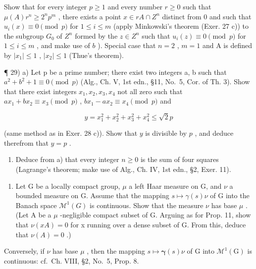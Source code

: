 Show that for every integer \(p \geqslant 1\) and every number \(r \geqslant 0\) such that \(\mu(A)r^n \geqslant 2^n p^m\) , there exists a point \(x \in rA \cap Z^n\) distinct from 0 and such that \(u_i(x) \equiv 0 \pmod{p}\) for \(1 \leqslant i \leqslant m\) (apply Minkowski's theorem (Exer. 27 c)) to the subgroup \(G_0\) of \(Z^n\) formed by the \(z \in Z^n\) such that \(u_i(z) \equiv 0 \pmod{p}\) for \(1 \leqslant i \leqslant m\) , and make use of \(b\) ). Special case that \(n = 2\) , \(m = 1\) and A is defined by \(|x_1| \leqslant 1\) , \(|x_2| \leqslant 1\) (Thue's theorem).

¶ 29) a) Let p be a prime number; there exist two integers a, b such that \(a^{2}+b^{2}+1 \equiv 0 \pmod{p}\) (Alg., Ch. V, 1st edn., §11, No.~5, Cor. of Th. 3). Show that there exist integers \(x_{1}, x_{2}, x_{3}, x_{4}\) not all zero such that \(ax_{1} + bx_{2} \equiv x_{3} \pmod{p}\) , \(bx_{1} - ax_{2} \equiv x_{4} \pmod{p}\) and

\[
y = x _ {1} ^ {2} + x _ {2} ^ {2} + x _ {3} ^ {2} + x _ {4} ^ {2} \leqslant \sqrt {2} p
\]

(same method as in Exer. 28 c)). Show that \(y\) is divisible by \(p\) , and deduce therefrom that \(y = p\) .

\begin{enumerate}
\def\labelenumi{\alph{enumi})}
\setcounter{enumi}{1}
\tightlist
\item
  Deduce from a) that every integer \(n \geqslant 0\) is the sum of four squares (Lagrange's theorem; make use of Alg., Ch. IV, 1st edn., §2, Exer. 11).
\end{enumerate}

\begin{enumerate}
\def\labelenumi{\arabic{enumi})}
\setcounter{enumi}{29}
\tightlist
\item
  Let G be a locally compact group, \(\mu\) a left Haar measure on G, and \(\nu\) a bounded measure on G. Assume that the mapping \(s \mapsto \gamma(s)\nu\) of G into the Banach space \(\mathcal{M}^{1}(G)\) is continuous. Show that the measure \(\nu\) has base \(\mu\) . (Let A be a \(\mu\) -negligible compact subset of G. Arguing as for Prop. 11, show that \(\nu(xA)=0\) for x running over a dense subset of G. From this, deduce that \(\nu(A)=0\) .)
\end{enumerate}

Conversely, if \(\nu\) has base \(\mu\) , then the mapping \(s \mapsto \pmb{\gamma}(s)\nu\) of G into \(\mathcal{M}^1(\mathrm{G})\) is continuous: cf.~Ch. VIII, §2, No.~5, Prop. 8.
\relax{}
